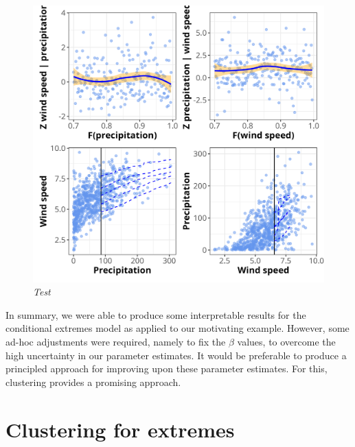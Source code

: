 \documentclass{article}
\numberwithin{equation}{section}
\begin{document}
\begin{figure}[H]
    \centering
    \includegraphics[width = 0.9\linewidth]{plots/048_diag.png}
    \caption{\emph{Test}}
    \label{fig:04_diag}
\end{figure}

In summary, we were able to produce some interpretable results for the conditional extremes model as applied to our motivating example.
However, some ad-hoc adjustments were required, namely to fix the $\beta$ values, to overcome the high uncertainty in our parameter estimates. 
It would be preferable to produce a principled approach for improving upon these parameter estimates. 
For this, clustering provides a promising approach. 

\newpage
\section{Clustering for extremes}\label{sec:clustering}

\end{document}
